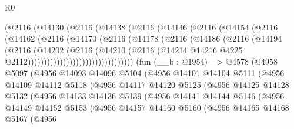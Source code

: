 \begin{lexlean}{R0}
\begin{coremodule}
                      (@2116
                        (@14130
                          (@2116
                            (@14138
                              (@2116
                                (@14146
                                  (@2116
                                    (@14154
                                      (@2116
                                        (@14162
                                          (@2116
                                            (@14170
                                              (@2116
                                                (@14178
                                                  (@2116
                                                    (@14186
                                                      (@2116
                                                        (@14194
                                                          (@2116
                                                            (@14202
                                                              (@2116
                                                                (@14210
                                                                  (@2116
                                                                    (@14214
                                                                      @14216
                                                                      @4225
                                                                      @2112)))))))))))))))))))))))))))))))))
    (fun (__b : @1954) =>
    @4578
      (@4958
        @5097
        (@4956
          @14093
          @14096
          @5104
          (@4956
            @14101
            @14104
            @5111
            (@4956
              @14109
              @14112
              @5118
              (@4956
                @14117
                @14120
                @5125
                (@4956
                  @14125
                  @14128
                  @5132
                  (@4956
                    @14133
                    @14136
                    @5139
                    (@4956
                      @14141
                      @14144
                      @5146
                      (@4956
                        @14149
                        @14152
                        @5153
                        (@4956
                          @14157
                          @14160
                          @5160
                          (@4956
                            @14165
                            @14168
                            @5167
                            (@4956

\end{coremodule}
\end{lexlean}
